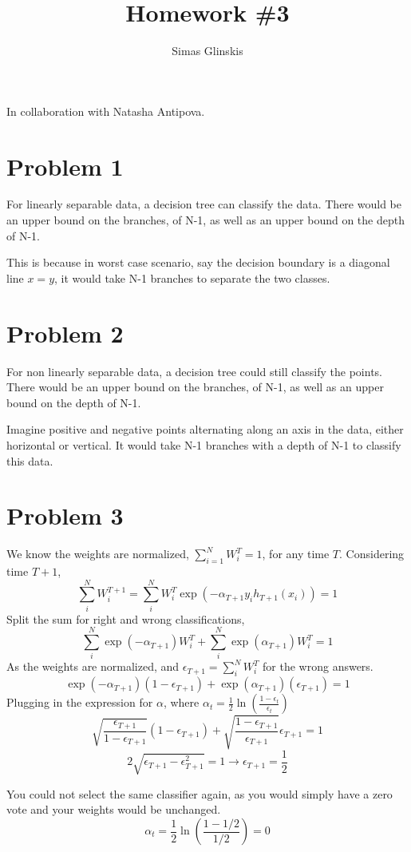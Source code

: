 \documentclass[]{article}
\title{Homework \#3}
\author{Simas Glinskis}
\begin{document}
\maketitle
In collaboration with Natasha Antipova.
\section*{Problem 1}
For linearly separable data, a decision tree can classify the data. There would be an upper bound on the branches, of N-1, as well as an upper bound on the depth of N-1. 

This is because in worst case scenario, say the decision boundary is a diagonal line $x=y$, it would take N-1 branches to separate the two classes. 

\section*{Problem 2}
For non linearly separable data, a decision tree could still classify the points. There would be an upper bound on the branches, of N-1, as well as an upper bound on the depth of N-1.  

Imagine positive and negative points alternating along an axis in the data, either horizontal or vertical. It would take N-1 branches with a depth of N-1 to classify this data.
\section*{Problem 3}
We know the weights are normalized, $\sum_{i=1}^{N}W_i^T = 1$, for any time $T$. Considering time $T+1$, 
\[
\sum_{i}^{N}W_i^{T+1} = \sum_{i}^{N}W_i^T\exp(-\alpha_{T+1}y_ih_{T+1}(x_i)) = 1
\]
Split the sum for right and wrong classifications,
\[
\sum_{i}^{N}\exp(-\alpha_{T+1})W_i^T + \sum_{i}^{N}\exp(\alpha_{T+1})W_i^T = 1
\]
As the weights are normalized, and $\epsilon_{T+1} = \sum_{i}^{N}W_i^T$ for the wrong answers. 
\[
\exp(-\alpha_{T+1})(1-\epsilon_{T+1})+\exp(\alpha_{T+1})(\epsilon_{T+1}) = 1
\]
Plugging in the expression for $\alpha$, where $\alpha_t = \frac{1}{2}\ln(\frac{1-\epsilon_t}{\epsilon_t})$
\[
\sqrt{\frac{\epsilon_{T+1}}{1-\epsilon_{T+1}}}(1-\epsilon_{T+1})+ \sqrt{\frac{1-\epsilon_{T+1}}{\epsilon_{T+1}}}\epsilon_{T+1} = 1
\]
\[
2\sqrt{\epsilon_{T+1}-\epsilon_{T+1}^2}=1\rightarrow\epsilon_{T+1}=\frac{1}{2}
\]

You could not select the same classifier again, as you would simply have a zero vote and your weights would be unchanged. 
\[
\alpha_t = \frac{1}{2}\ln(\frac{1-1/2}{1/2}) = 0
\] 
\end{document}
